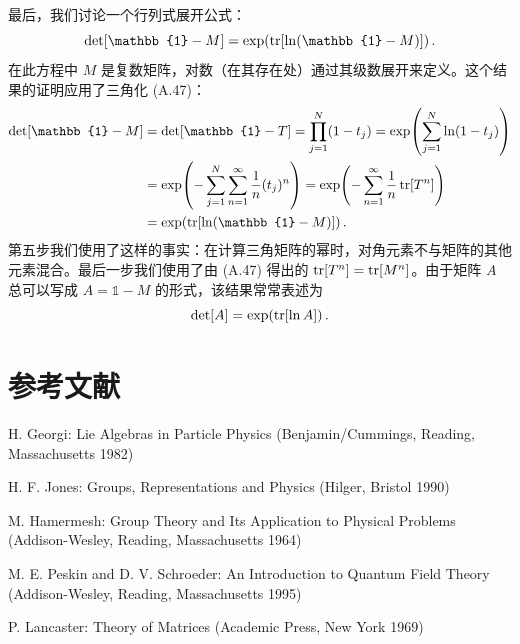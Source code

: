 最后，我们讨论一个行列式展开公式：
\begin{equation}
  \det[\mathbb{1} - M] = \exp\!\left(\tr[\ln(\mathbb{1} - M)]\right).
\end{equation}
在此方程中 $M$ 是复数矩阵，对数（在其存在处）通过其级数展开来定义。这个结果的证明应用了三角化 (A.47)：
\begin{align}
  \det[\mathbb{1} - M] &= \det[\mathbb{1} - T] = \prod_{j=1}^{N}(1 - t_j)
  = \exp\!\left(\sum_{j=1}^{N}\ln(1 - t_j)\right) \notag\\
  &= \exp\!\left(-\sum_{j=1}^{N}\sum_{n=1}^{\infty}\frac{1}{n}(t_j)^n\right)
  = \exp\!\left(-\sum_{n=1}^{\infty}\frac{1}{n}\tr[T^n]\right) \notag\\
  &= \exp\!\left(\tr[\ln(\mathbb{1} - M)]\right).
\end{align}
第五步我们使用了这样的事实：在计算三角矩阵的幂时，对角元素不与矩阵的其他元素混合。最后一步我们使用了由 (A.47) 得出的 $\operatorname{tr}[T^n] = \operatorname{tr}[M^n]$。由于矩阵 $A$ 总可以写成 $A = \mathbb{1} - M$ 的形式，该结果常常表述为
\begin{equation}
  \det[A] = \exp\!\left(\operatorname{tr}[\ln A]\right).
\end{equation}

\section*{参考文献}

\begin{enumerate}[label={[\arabic*]}]
  \item H. Georgi: Lie Algebras in Particle Physics (Benjamin/Cummings,
    Reading, Massachusetts 1982)
  \item H. F. Jones: Groups, Representations and Physics (Hilger, Bristol 1990)
  \item M. Hamermesh: Group Theory and Its Application to Physical Problems
    (Addison-Wesley, Reading, Massachusetts 1964)
  \item M. E. Peskin and D. V. Schroeder: An Introduction to Quantum Field
    Theory (Addison-Wesley, Reading, Massachusetts 1995)
  \item P. Lancaster: Theory of Matrices (Academic Press, New York 1969)
\end{enumerate}
